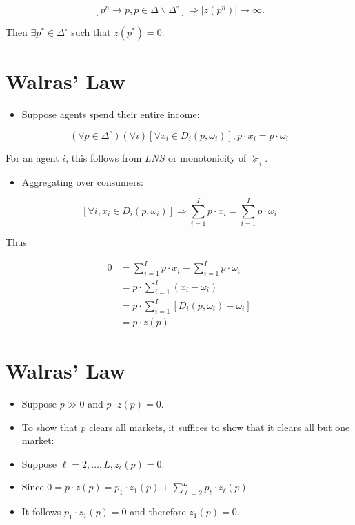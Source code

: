 \documentclass[10pt]{article}
\begin{document}
$$
\left[p^{n} \rightarrow p, p \in \Delta \backslash \Delta^{\circ}\right] \Longrightarrow\left|z\left(p^{n}\right)\right| \rightarrow \infty .
$$

Then $\exists p^{*} \in \Delta^{\circ}$ such that $z\left(p^{*}\right)=0$.

\section*{Walras' Law}
\begin{itemize}
  \item Suppose agents spend their entire income:
\end{itemize}

$$
\left(\forall p \in \Delta^{\circ}\right)(\forall i)\left[\forall x_{i} \in D_{i}\left(p, \omega_{i}\right)\right], p \cdot x_{i}=p \cdot \omega_{i}
$$

For an agent $i$, this follows from $L N S$ or monotonicity of $\succeq_{i}$.

\begin{itemize}
  \item Aggregating over consumers:
\end{itemize}

$$
\left[\forall i, x_{i} \in D_{i}\left(p, \omega_{i}\right)\right] \Longrightarrow \sum_{i=1}^{I} p \cdot x_{i}=\sum_{i=1}^{I} p \cdot \omega_{i}
$$

Thus

$$
\begin{aligned}
0 & =\sum_{i=1}^{I} p \cdot x_{i}-\sum_{i=1}^{I} p \cdot \omega_{i} \\
& =p \cdot \sum_{i=1}^{I}\left(x_{i}-\omega_{i}\right) \\
& =p \cdot \sum_{i=1}^{I}\left[D_{i}\left(p, \omega_{i}\right)-\omega_{i}\right] \\
& =p \cdot z(p)
\end{aligned}
$$

\section*{Walras' Law}
\begin{itemize}
  \item Suppose $p \gg 0$ and $p \cdot z(p)=0$.
  \item To show that $p$ clears all markets, it suffices to show that it clears all but one market:
  \item Suppose $\ell=2, \ldots, L, z_{\ell}(p)=0$.
  \item Since $0=p \cdot z(p)=p_{1} \cdot z_{1}(p)+\sum_{\ell=2}^{L} p_{\ell} \cdot z_{\ell}(p)$
  \item It follows $p_{1} \cdot z_{1}(p)=0$ and therefore $z_{1}(p)=0$.
\end{itemize}
\end{document}
